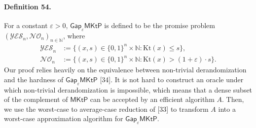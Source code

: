 \paragraph{Definition 54.} For a constant $\varepsilon>0$, $\mathsf{Gap}_{\varepsilon}\mathsf{MKtP}$ is defined to be the promise problem $(\mathcal{YES}_n,\mathcal{NO}_n)_{n\in\mathbb N}$, where
\begin{align*}
\mathcal{YES}_n&:=\{(x,s)\in\{0,1\}^n\times\mathbb N:\mathrm{Kt}(x)\leq s\},\\
\mathcal{NO}_n&:=\{(x,s)\in\{0,1\}^n\times\mathbb N:\mathrm{Kt}(x)>(1+\varepsilon)\cdot s\}.
\end{align*}
Our proof relies heavily on the equivalence between non-trivial derandomization and the hardness of $\mathsf{Gap}_{\varepsilon}\mathsf{MKtP}$ [34]. It is not hard to construct an oracle under which non-trivial derandomization is impossible, which means that a dense subset of the complement of $\mathsf{MKtP}$ can be accepted by an efficient algorithm $A$. Then, we use the worst-case to average-case reduction of [33] to transform $A$ into a worst-case approximation algorithm for $\mathsf{Gap}_{\varepsilon}\mathsf{MKtP}$.
